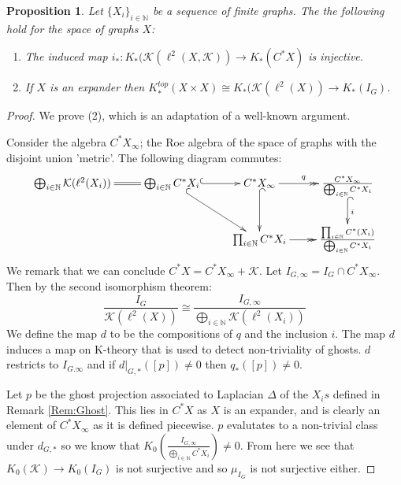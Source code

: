 \documentclass[11pt]{amsart}
\theoremstyle{plain}
\newtheorem{proposition}[theorem]{Proposition}%
\theoremstyle{definition}%
\theoremstyle{remark}%
\begin{document}
\begin{proposition}\label{Prop:Ghost}
Let $\lbrace X_{i} \rbrace_{i\in \mathbb{N}}$ be a sequence of finite graphs. The the following hold for the space of graphs $X$:
\begin{enumerate}
\item The induced map $i_{*}:K_{*}(\mathcal{K}(\ell^{2}(X,\mathcal{K})) \rightarrow K_{*}(C^{*}X)$ is injective.
\item If $X$ is an expander then $K_{*}^{top}(X\times X)\cong K_{*}(\mathcal{K}(\ell^{2}(X)) \rightarrow K_{*}(I_{G})$.
\end{enumerate}
\end{proposition}
\begin{proof}
We prove (2), which is an adaptation of a well-known argument.

Consider the algebra $C^{*}X_{\infty}$; the Roe algebra of the space of graphs with the disjoint union 'metric'. The following diagram commutes:
\begin{equation*}
\xymatrix{\bigoplus_{i\in\mathbb{N}}\mathcal{K}(\ell^{2}(X_{i}))\ar@{=}[r] &\bigoplus_{i\in \mathbb{N}}C^{*}X_{i} \ar@{^{(}->}[r]\ar@{^{(}->}[dr] & C^{*}X_{\infty} \ar@{->>}[r]^{q} \ar@{^{(}->}[d] & \frac{C^{*}X_{\infty}}{\bigoplus_{i\in\mathbb{N}}C^{*}X_{i}}\ar@{^{(}->}[d]^{i}\\
& & \prod_{i\in \mathbb{N}}C^{*}X_{i} \ar@{->>}[r]& \frac{\prod_{i\in\mathbb{N}} C^{*}(X_{i})}{\bigoplus_{i\in\mathbb{N}}C^{*}X_{i}}
}
\end{equation*}
We remark that we can conclude $C^{*}X = C^{*}X_{\infty}+\mathcal{K}$. Let $I_{G,\infty} = I_{G}\cap C^{*}X_{\infty}$. Then by the second isomorphism theorem:
\begin{equation*}
\frac{I_{G}}{\mathcal{K}(\ell^{2}(X))}\cong \frac{I_{G,\infty}}{\bigoplus_{i\in\mathbb{N}}\mathcal{K}(\ell^{2}(X_{i}))}
\end{equation*}
We define the map $d$ to be the compositions of $q$ and the inclusion $i$. The map $d$ induces a map on K-theory that is used to detect non-triviality of ghosts. $d$ restricts to $I_{G.\infty}$ and if $d|_{G,*}([p])\not=0$ then $q_{*}([p])\not=0$.

Let $p$ be the ghost projection associated to Laplacian $\Delta$ of the $X_{i}s$ defined in Remark \ref{Rem:Ghost}. This lies in $C^{*}X$ as $X$ is an expander, and is clearly an element of $C^{*}X_{\infty}$ as it is defined piecewise. $p$ evalutates to a non-trivial class under $d_{G,*}$ so we know that $K_{0}(\frac{I_{G,\infty}}{\bigoplus_{i\in\mathbb{N}}C^{*}X_{i}})\not= 0$. From here we see that $K_{0}(\mathcal{K}) \rightarrow K_{0}(I_{G})$ is not surjective and so $\mu_{I_{G}}$ is not surjective either.


\end{proof}
\end{document}
